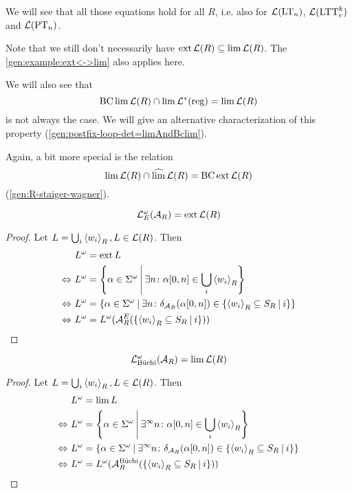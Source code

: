 We will see that all those equations hold for all $R$, i.e. also for $\mathcal{L}(\textup{\textrm{LT}}_n)$, $\mathcal{L}(\textup{\textrm{LTT}}^k_r)$ and $\mathcal{L}(\textup{\textrm{PT}}_n)$.

Note that we still don't necessarily have $\operatorname{ext} \mathcal{L}(R) \subseteq \lim \mathcal{L}(R)$. The \cref{gen:example:ext<->lim} also applies here.

We will also see that
\[ \operatorname{BC} \lim \mathcal{L}(R) \cap \lim \mathcal{L}^*(\textup{\textrm{reg}}) = \lim \mathcal{L}(R) \]
is not always the case. We will give an alternative characterization of this property (\cref{gen:postfix-loop-det=limAndBclim}).

Again, a bit more special is the relation
\[ \lim \mathcal{L}(R) \cap \operatorname{\widehat{lim}} \mathcal{L}(R) = \operatorname{BC} \operatorname{ext} \mathcal{L}(R) \]
(\cref{gen:R-staiger-wagner}).

\begin{lemma}
\label{gen:lang_omega_e}
\[ \mathcal{L}^\omega_E(\mathcal{A}_R) = \operatorname{ext} \mathcal{L}(R) \]
\begin{proof}
Let $L = \bigcup_i \left< w_i\right>_R, L \in \mathcal{L}(R)$. Then
\begin{align*}
& L^\omega = \ext L \\
\Leftrightarrow \ & L^\omega = \Set{\alpha \in \Sigma^\omega}{\exists n \colon \alpha[0,n] \in \bigcup_i \left< w_i\right>_R} \\
\Leftrightarrow \ & L^\omega = \Set{\alpha \in \Sigma^\omega}{\exists n \colon \delta_{\A_R}(\alpha[0,n]) \in \Set{\left< w_i\right>_R \subseteq S_R}{i}} \\
\Leftrightarrow \ & L^\omega = L^\omega(\A^E_R(\Set{\left< w_i\right>_R \subseteq S_R}{i}))
\end{align*}
\end{proof}
\end{lemma}

\begin{lemma}
\label{gen:lang_omega_buechi}
\[ \mathcal{L}^\omega_{\text{Büchi}}(\mathcal{A}_R) = \lim \mathcal{L}(R) \]
\begin{proof}
Let $L = \bigcup_i \left< w_i\right>_R, L \in \mathcal{L}(R)$. Then
\begin{align*}
& L^\omega = \lim L \\
\Leftrightarrow \ & L^\omega = \Set{\alpha \in \Sigma^\omega}{\exists^\infty n \colon \alpha[0,n] \in \bigcup_i \left< w_i\right>_R} \\
\Leftrightarrow \ & L^\omega = \Set{\alpha \in \Sigma^\omega}{\exists^\infty n \colon \delta_{\A_R}(\alpha[0,n]) \in \Set{\left< w_i\right>_R \subseteq S_R}{i}} \\
\Leftrightarrow \ & L^\omega = L^\omega(\A^{\text{Büchi}}_R(\Set{\left< w_i\right>_R \subseteq S_R}{i}))
\end{align*}
\end{proof}
\end{lemma}

